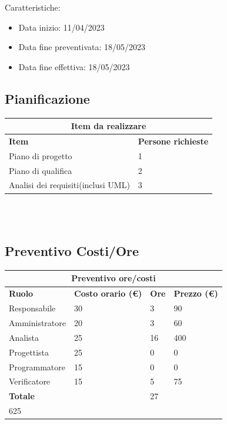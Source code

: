 \documentclass[12pt]{article}
\begin{document}
Caratteristiche:
\begin{itemize}
    \item Data inizio: 11/04/2023
    \item Data fine preventivata: 18/05/2023
    \item Data fine effettiva: 18/05/2023
\end{itemize}

\subsection{Pianificazione}
\begin{center}
    \begin{tabularx}{\textwidth}{|X|X|}
        \hline
        \multicolumn{2}{|c|}{\textbf{Item da realizzare}}\\
        \hline
        \hline
        \textbf{Item} & \textbf{Persone richieste}\\
        \hline
        Piano di progetto & 1\\
        \hline
        Piano di qualifica & 2\\
        \hline
        Analisi dei requisiti(inclusi UML) & 3 \\
        \hline
    \end{tabularx}\\[8pt]
    \mbox{}\\
\end{center}
\subsection{Preventivo Costi/Ore}
\begin{center}
    \begin{tabularx}{\textwidth}{|X|X|X|X|}
        \hline
        \multicolumn{4}{|c|}{\textbf{Preventivo ore/costi}}\\
        \hline
        \hline
        \textbf{Ruolo} & \textbf{Costo orario (\euro)} & \textbf{Ore} & \textbf{Prezzo (\euro)}\\
        \hline
        Responsabile    & 30 & 3  & 90\\   
        \hline
        Amministratore  & 20 & 3  & 60\\ 
        \hline
        Analista        & 25 & 16  & 400\\ 
        \hline
        Progettista     & 25 & 0  & 0\\
        \hline
        Programmatore   & 15 & 0  & 0\\
        \hline
        Verificatore    & 15 & 5  & 75\\
        \hline
        \hline
        \textbf{Totale} &    & 27 & \\ 625\\
        \hline
    \end{tabularx}\\[8pt]
    \mbox{}\\
\end{center}
\end{document}
